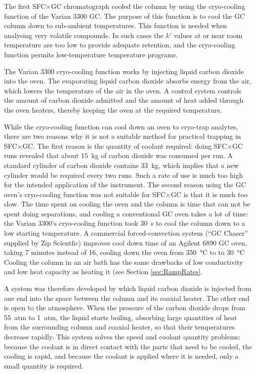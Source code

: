 The first SFC×GC chromatograph cooled the column by using the cryo-cooling
function of the Varian 3300 GC. The purpose of this function is to cool the GC
column down to sub-ambient temperatures. This function is needed when analysing
very volatile compounds. In such cases the \(k'\) values at or near room
temperature are too low to provide adequate retention, and the cryo-cooling
function permits low-temperature temperature programs.

The Varian 3300 cryo-cooling function works by injecting liquid carbon dioxide
into the oven. The evaporating liquid carbon dioxide absorbs energy from the
air, which lowers the temperature of the air in the oven. A control system
controls the amount of carbon dioxide admitted and the amount of heat added
through the oven heaters, thereby keeping the oven at the required temperature.

While the cryo-cooling function can cool down an oven to cryo-trap analytes,
there are two reasons why it is not a suitable method for practical trapping in
SFC×GC. The first reason is the quantity of coolant required: doing SFC×GC runs
revealed that about \SI{15}{\kilogram} of carbon dioxide was consumed per run. A
standard cylinder of carbon dioxide contains \SI{33}{\kilogram}, which implies
that a new cylinder would be required every two runs. Such a rate of use is much
too high for the intended application of the instrument. The second reason using
the GC oven's cryo-cooling function was not suitable for SFC×GC is that it is
much too slow. The time spent on cooling the oven and the column is time that
can not be spent doing separations, and cooling a conventional GC oven takes a
lot of time: the Varian 3300's cryo-cooling function took \SI{30}{\second} to
cool the column down to a low starting temperature. A commercial
forced-convection system (``GC Chaser'' supplied by Zip Scientfic) improves cool
down time of an Agilent 6890 GC oven, taking 7 minutes instead of 16, cooling
down the oven from \SI{350}{\celsius} to to \SI{30}{\celsius} Cooling the
column in an air bath has the same drawbacks of low conductivity and low heat
capacity as heating it (see Section \ref{sec:RampRates}.

A system was therefore developed by which liquid carbon dioxide is injected from
one end into the space between the column and its coaxial heater. The other end
is open to the atmosphere. When the pressure of the carbon dioxide drops from
\SI{55}{atm} to \SI{1}{atm}, the liquid starts boiling, absorbing large
quantities of heat from the surrounding column and coaxial heater, so that their
temperatures decrease rapidly. This system solves the speed and coolant quantity
problems: because the coolant is in direct contact with the parts that need to
be cooled, the cooling is rapid, and because the coolant is applied where it is
needed, only a small quantity is required.

